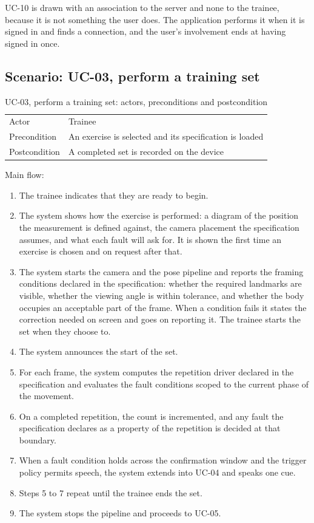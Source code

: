 UC-10 is drawn with an association to the server and none to the trainee, because it is not something the user does. The application performs it when it is signed in and finds a connection, and the user's involvement ends at having signed in once.

\subsection{Scenario: UC-03, perform a training set}
\label{sec:3.2.3}

{\small
\setlength{\LTpre}{6pt}\setlength{\LTpost}{8pt}
\begin{longtable}{>{\raggedright\arraybackslash}p{}>{\raggedright\arraybackslash}p{}}
\caption{UC-03, perform a training set: actors, preconditions and postcondition}\\
\toprule
\endfirsthead
\endhead
\bottomrule
\endlastfoot
Actor & Trainee \\
Precondition & An exercise is selected and its specification is loaded \\
Postcondition & A completed set is recorded on the device \\
\end{longtable}
}

Main flow:

\begin{enumerate}
\item The trainee indicates that they are ready to begin.
\item The system shows how the exercise is performed: a diagram of the position the measurement is defined against, the camera placement the specification assumes, and what each fault will ask for. It is shown the first time an exercise is chosen and on request after that.
\item The system starts the camera and the pose pipeline and reports the framing conditions declared in the specification: whether the required landmarks are visible, whether the viewing angle is within tolerance, and whether the body occupies an acceptable part of the frame. When a condition fails it states the correction needed on screen and goes on reporting it. The trainee starts the set when they choose to.
\item The system announces the start of the set.
\item For each frame, the system computes the repetition driver declared in the specification and evaluates the fault conditions scoped to the current phase of the movement.
\item On a completed repetition, the count is incremented, and any fault the specification declares as a property of the repetition is decided at that boundary.
\item When a fault condition holds across the confirmation window and the trigger policy permits speech, the system extends into UC-04 and speaks one cue.
\item Steps 5 to 7 repeat until the trainee ends the set.
\item The system stops the pipeline and proceeds to UC-05.
\end{enumerate}

